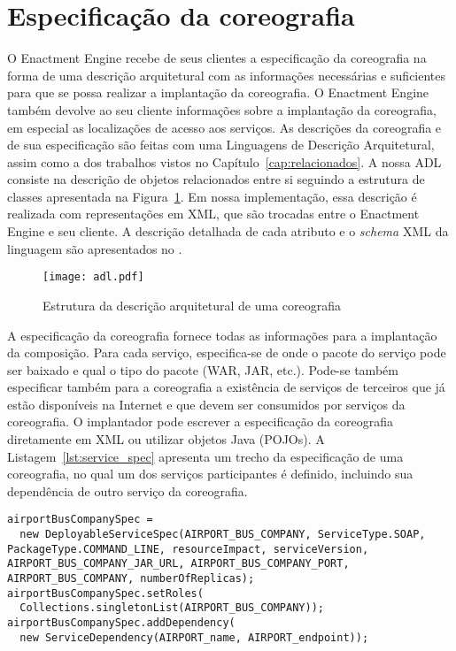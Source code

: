 \section{Especificação da coreografia}
\label{sec:spec}

O Enactment Engine recebe de seus clientes a especificação da coreografia na forma 
de uma descrição arquitetural com as informações necessárias e suficientes para 
que se possa realizar a implantação da coreografia. 
O Enactment Engine também devolve ao seu cliente informações sobre a implantação da coreografia, 
em especial as localizações de acesso aos serviços. As descrições da coreografia e de sua 
especificação são feitas com uma Linguagens de Descrição Arquitetural, assim como a dos trabalhos vistos no Capítulo~\ref{cap:relacionados}. 
A nossa ADL consiste na descrição de objetos relacionados entre si seguindo 
a estrutura de classes apresentada na Figura~\ref{fig:adl}. 
Em nossa implementação, essa descrição é realizada com representações em XML, 
que são trocadas entre o Enactment Engine e seu cliente. 
A descrição detalhada de cada atributo e o \emph{schema} XML da linguagem
são apresentados no \userguide.

\begin{figure}[!h]
  \centering
  \texttt{[image: adl.pdf]} 
  \caption{Estrutura da descrição arquitetural de uma coreografia}
  \label{fig:adl} 
\end{figure}


A especificação da coreografia fornece todas as informações para a implantação da composição.
Para cada serviço, especifica-se de onde o pacote do serviço pode ser baixado
e qual o tipo do pacote (WAR, JAR, etc.).
Pode-se também especificar também para a coreografia a existência de serviços
de terceiros que já estão disponíveis na Internet e que devem
ser consumidos por serviços da coreografia.
O implantador pode escrever a especificação da coreografia diretamente em XML
ou utilizar objetos Java (POJOs).
A Listagem~\ref{lst:service_spec} apresenta um trecho da especificação de uma coreografia,
no qual um dos serviços participantes é definido,
incluindo sua dependência de outro serviço da coreografia.

\lstset{
language=Java,
}

{\scriptsize
\begin{lstlisting}[breaklines, caption={Trecho da especificação de uma coreografia.}, label={lst:service_spec}]
airportBusCompanySpec =
  new DeployableServiceSpec(AIRPORT_BUS_COMPANY, ServiceType.SOAP, PackageType.COMMAND_LINE, resourceImpact, serviceVersion, AIRPORT_BUS_COMPANY_JAR_URL, AIRPORT_BUS_COMPANY_PORT, AIRPORT_BUS_COMPANY, numberOfReplicas);
airportBusCompanySpec.setRoles(
  Collections.singletonList(AIRPORT_BUS_COMPANY));
airportBusCompanySpec.addDependency(
  new ServiceDependency(AIRPORT_name, AIRPORT_endpoint));
\end{lstlisting}
}

